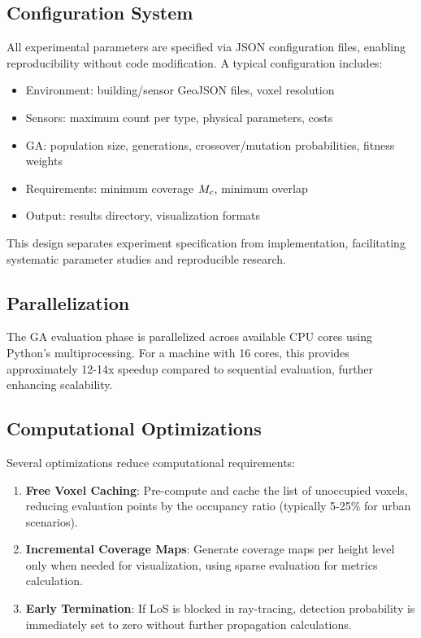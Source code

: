 \subsection{Configuration System}

All experimental parameters are specified via JSON configuration files, enabling reproducibility without code modification. A typical configuration includes:

\begin{itemize}
\item Environment: building/sensor GeoJSON files, voxel resolution
\item Sensors: maximum count per type, physical parameters, costs
\item GA: population size, generations, crossover/mutation probabilities, fitness weights
\item Requirements: minimum coverage $M_c$, minimum overlap
\item Output: results directory, visualization formats
\end{itemize}

This design separates experiment specification from implementation, facilitating systematic parameter studies and reproducible research.

\subsection{Parallelization}

The GA evaluation phase is parallelized across available CPU cores using Python's multiprocessing. For a machine with 16 cores, this provides approximately 12-14x speedup compared to sequential evaluation, further enhancing scalability.

\subsection{Computational Optimizations}

Several optimizations reduce computational requirements:

\begin{enumerate}
\item \textbf{Free Voxel Caching}: Pre-compute and cache the list of unoccupied voxels, reducing evaluation points by the occupancy ratio (typically 5-25\% for urban scenarios).

\item \textbf{Incremental Coverage Maps}: Generate coverage maps per height level only when needed for visualization, using sparse evaluation for metrics calculation.

\item \textbf{Early Termination}: If LoS is blocked in ray-tracing, detection probability is immediately set to zero without further propagation calculations.
\end{enumerate}

